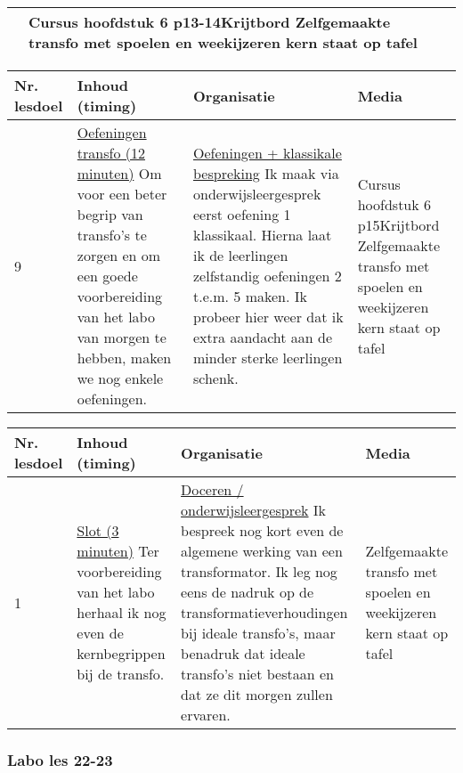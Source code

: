 \begin{landscape}
\begin{tabularx}{1.56\textwidth}{|p{1.5cm}|p{8cm}|X|p{4cm}|}
	&   Cursus hoofdstuk 6 p13-14\newline\newline Krijtbord \newline\newline Zelfgemaakte transfo met spoelen en weekijzeren kern staat op tafel
	\\ \hline
	\end{tabularx}\vspace{5mm}

		\begin{tabularx}{1.56\textwidth}{|p{1.5cm}|p{8cm}|X|p{4cm}|}
		\hline
		\textbf{Nr. lesdoel } & \textbf{Inhoud (timing)}  & \textbf{Organisatie } & \textbf{Media } \\ \hline
		9\newline 10&\underline{Oefeningen transfo (12 minuten)}\newline
		Om voor een beter begrip van transfo's te zorgen en om een goede voorbereiding van het labo van morgen te hebben, maken we nog enkele oefeningen.
		&  \underline{Oefeningen + klassikale bespreking}\newline 
		Ik maak via onderwijsleergesprek eerst oefening 1 klassikaal. Hierna laat ik de leerlingen zelfstandig oefeningen 2 t.e.m. 5 maken. Ik probeer hier weer dat ik extra aandacht aan de minder sterke leerlingen schenk.
		&   Cursus hoofdstuk 6 p15\newline\newline Krijtbord \newline\newline Zelfgemaakte transfo met spoelen en weekijzeren kern staat op tafel
		\\ \hline
	\end{tabularx}\vspace{5mm}

\begin{tabularx}{1.56\textwidth}{|p{1.5cm}|p{8cm}|X|p{4cm}|}
	\hline
	\textbf{Nr. lesdoel } & \textbf{Inhoud (timing)}  & \textbf{Organisatie } & \textbf{Media } \\ \hline
	1&\underline{Slot (3 minuten)}\newline
	Ter voorbereiding van het labo herhaal ik nog even de kernbegrippen bij de transfo.
	&  \underline{Doceren / onderwijsleergesprek}\newline 
	Ik bespreek nog kort even de algemene werking van een transformator. Ik leg nog eens de nadruk op de transformatieverhoudingen bij ideale transfo's, maar benadruk dat ideale transfo's niet bestaan en dat ze dit morgen zullen ervaren.
	& Zelfgemaakte transfo met spoelen en weekijzeren kern staat op tafel
	\\ \hline
\end{tabularx}\vspace{5mm}


\subsubsection{Labo les 22-23}






\end{landscape}


